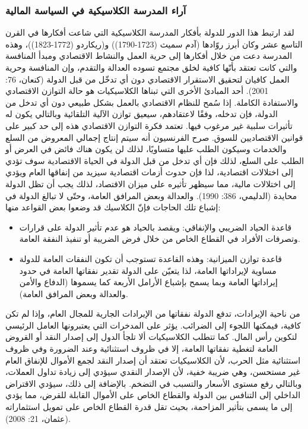 \documentclass[10pt,a4paper]{report}
\begin{document}
\begin{doublespacing}
\subsubsection{آراء المدرسة الكلاسيكية في السياسة المالية}
لقد ارتبط هذا الدور للدولة بأفكار المدرسة الكلاسيكية التي شاعت أفكارها في القرن التاسع عشر وكان أبرز روّادها {(آدم سميث   (1723-1790))} و{(ريكاردو   (1772-1823))}، وهذه المدرسة دعت من خلال أفكارها إلى حرية العمل والنشاط الاقتصادي ومبدأ المنافسة والتي كانت تعتقد بأنّها كافية لخلق مجتمع تسوده العدالة والتقدم، وإن المنافسة وحرية العمل كافيان لتحقيق الاستقرار الاقتصادي دون أي تدخّل من قبل الدولة {(كنعان، 76: 2001)}.
أحد المبادئ الأخرى التي تبناها الكلاسيكيات هو حالة التوازن الاقتصادي والاستفادة الكاملة. إذا سُمح للنظام الاقتصادي بالعمل بشكل طبيعي دون أي تدخل من الدولة، فإن تدخله، وفقًا لاعتقادهم، سيعيق توازن الآلية التلقائية وبالتالي يكون له تأثيرات سلبية غير مرغوب فيها. تعتمد فكرة التوازن الاقتصادي هذه إلى حد كبير على قوانين الاقتصاديين للسوق. صرح الفرنسيون  أنه سيتم إنتاج إجمالي المعروض من السلع والخدمات وسيكون الطلب عليها متساويًا، لذلك لن يكون هناك فائض في العرض أو الطلب على السلع، لذلك فإن أي تدخل من قبل الدولة في الحياة الاقتصادية سوف تؤدي إلى اختلالات اقتصادية، لذا فإن حدوث أزمات اقتصادية سيزيد من إنفاقها العام ويؤدي إلى اختلالات مالية، مما سيظهر تأثيره على ميزان الاقتصاد، لذلك يجب أن تظل الدولة محايدة {(الدليمي، 386: 1990)}. 
والعدالة وبعض المرافق العامة، وحتّى لا تبالغ الدولة في إشباع تلك الحاجات فإنّ الكلاسيك قد وضعوا بعض القواعد منها:
\begin{itemize}
	\item قاعدة الحياد الضريبي والإنفاقي: ويقصد بالحياد هو عدم تأثير الدولة على قرارات وتصرفات الأفراد في القطاع الخاص من خلال فرض الضريبة أو تنفيذ النفقة العامة.
	\item قاعدة توازن الميزانية: وهذه القاعدة تستوجب أن تكون النفقات العامة للدولة مساوية لإيراداتها العامة، لذا يتعيّن على الدولة تقدير نفقاتها العامة في حدود إيراداتها العامة وبما يسمح بإشباع الأرامل الأربعة كما يسموها (الدفاع والأمن والعدالة وبعض المرافق العامة).
\end{itemize}
من ناحية الإيرادات، تدفع الدولة نفقاتها من الإيرادات الجارية للمجال العام، وإذا لم تكن كافية، فيمكنها اللجوء إلى الضرائب. يؤثر على المدخرات التي يعتبرونها العامل الرئيسي لتكوين رأس المال. كما تتطلب الكلاسيكيات ألا تلجأ الدول إلى إصدار النقد أو القروض العامة لتغطية نفقاتها العامة، إلا في ظروف استثنائية وعند الضرورة وفي ظروف استثنائية مثل الحرب، لأن الكلاسيكيات تعتقد أن إصدار النقد لجمع الأموال للإنفاق العام غير مستحسن، وهي ضريبة خفية، لأن الإصدار النقدي سيؤدي إلى زيادة تداول العملات، وبالتالي رفع مستوى الأسعار والتسبب في التضخم.
بالإضافة إلى ذلك، سيؤدي الاقتراض الداخلي إلى التنافس بين الدولة والقطاع الخاص على الأموال القابلة للقرض، مما يؤدي إلى ما يسمى بتأثير المزاحمة، بحيث تقل قدرة القطاع الخاص على تمويل استثماراته {(عثمان، 21: 2008)}.

\end{doublespacing}
\end{document}
